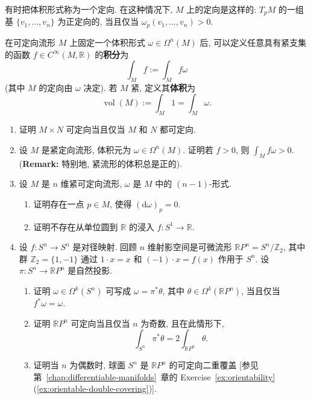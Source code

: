 \begin{RiemannRemark}\label{rem:orientation-determined-by-volume-form}
有时把体积形式称为一个定向. 在这种情况下, $M$ 上的定向是这样的: $T_pM$ 的一组基 $\{v_1,\ldots,v_n\}$ 为正定向的, 当且仅当 $\omega_p(v_1,\ldots,v_n)>0$.
\end{RiemannRemark}

在可定向流形 $M$ 上固定一个体积形式 $\omega\in\Omega^n(M)$ 后, 可以定义任意具有紧支集的函数 $f\in C^\infty(M,\mathbb{R})$ 的\textbf{积分}为
\[
  \int_Mf:=\int_Mf\omega
\]
(其中 $M$ 的定向由 $\omega$ 决定). 若 $M$ 紧, 定义其\textbf{体积}为
\[
  \operatorname{vol}(M):=\int_M1=\int_M\omega.
\]

\begin{RiemannExercise}\label{ex:orientation-and-volume-forms}
\begin{enumerate}[label=(\arabic*),ref=\arabic*,leftmargin=*]
\item\label{ex:orientability-of-product} 证明 $M\times N$ 可定向当且仅当 $M$ 和 $N$ 都可定向.
\item\label{ex:positive-integral-against-volume} 设 $M$ 是紧定向流形, 体积元为 $\omega\in\Omega^n(M)$. 证明若 $f>0$, 则 $\int_Mf\omega>0$.
{\small (\textbf{Remark:} 特别地, 紧流形的体积总是正的).}
\item\label{ex:vanishing-exterior-derivative-on-compact-orientable} 设 $M$ 是 $n$ 维紧可定向流形, $\omega$ 是 $M$ 中的 $(n-1)$-形式.
\begin{enumerate}[label=(\alph*),leftmargin=*]
\item 证明存在一点 $p\in M$, 使得 $(\mathrm{d}\omega)_p=0$.
\item 证明不存在从单位圆到 $\mathbb{R}$ 的浸入 $f:S^1\to\mathbb{R}$.
\end{enumerate}
\item\label{ex:forms-and-orientation-on-projective-space} 设 $f:S^n\to S^n$ 是对径映射. 回顾 $n$ 维射影空间是可微流形 $\mathbb{R}P^n=S^n/\mathbb{Z}_2$, 其中群 $\mathbb{Z}_2=\{1,-1\}$ 通过 $1\cdot x=x$ 和 $(-1)\cdot x=f(x)$ 作用于 $S^n$. 设 $\pi:S^n\to\mathbb{R}P^n$ 是自然投影.
\begin{enumerate}[label=(\alph*),leftmargin=*]
\item 证明 $\omega\in\Omega^k(S^n)$ 可写成 $\omega=\pi^*\theta$, 其中 $\theta\in\Omega^k(\mathbb{R}P^n)$, 当且仅当 $f^*\omega=\omega$.
\item 证明 $\mathbb{R}P^n$ 可定向当且仅当 $n$ 为奇数, 且在此情形下,
\[
  \int_{S^n}\pi^*\theta=2\int_{\mathbb{R}P^n}\theta.
\]
\item 证明当 $n$ 为偶数时, 球面 $S^n$ 是 $\mathbb{R}P^n$ 的可定向二重覆盖 [参见第~\ref{chap:differentiable-manifolds}~章的 Exercise~\ref{ex:orientability}(\ref{ex:orientable-double-covering})].

\end{enumerate}
\end{enumerate}
\end{RiemannExercise}
